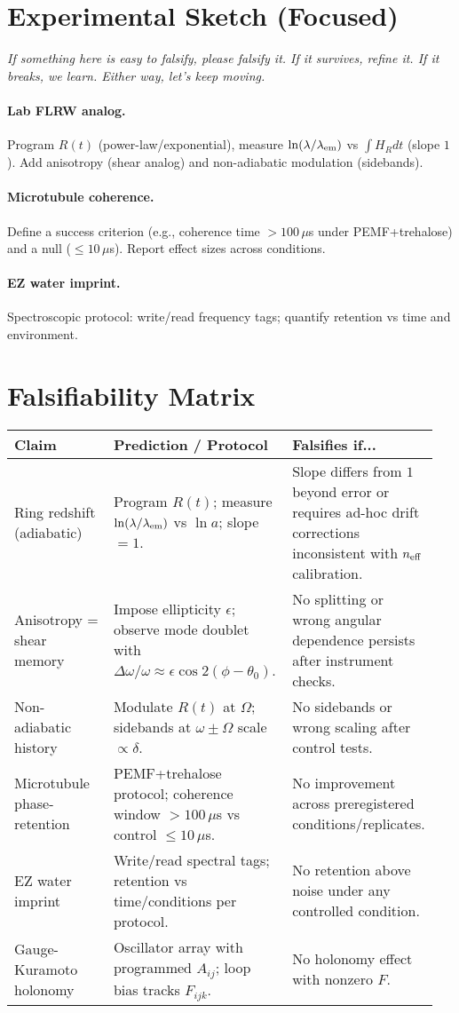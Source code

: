 \documentclass[11pt]{article}
\begin{document}
\section{Experimental Sketch (Focused)}
\noindent\textit{If something here is easy to falsify, please falsify it. If it survives, refine it. If it breaks, we learn. Either way, let's keep moving.}

\paragraph{Lab FLRW analog.} Program $R(t)$ (power-law/exponential), measure $\ln(\lambda/\lambda_{\rm em})$ vs $\int H_R dt$ (slope $1$). Add anisotropy (shear analog) and non-adiabatic modulation (sidebands).

\paragraph{Microtubule coherence.} Define a success criterion (e.g., coherence time $>100\,\mu$s under PEMF+trehalose) and a null ($\le 10\,\mu$s). Report effect sizes across conditions.

\paragraph{EZ water imprint.} Spectroscopic protocol: write/read frequency tags; quantify retention vs time and environment.

\section{Falsifiability Matrix}
\begin{tabular}{p{0.28\linewidth} p{0.45\linewidth} p{0.22\linewidth}}
\hline
\textbf{Claim} & \textbf{Prediction / Protocol} & \textbf{Falsifies if...} \\
\hline
Ring redshift (adiabatic) & Program $R(t)$; measure $\ln(\lambda/\lambda_{\rm em})$ vs $\ln a$; slope $=1$. & Slope differs from $1$ beyond error or requires ad-hoc drift corrections inconsistent with $n_{\rm eff}$ calibration. \\
Anisotropy = shear memory & Impose ellipticity $\epsilon$; observe mode doublet with $\Delta\omega/\omega\approx \epsilon\cos2(\phi-\theta_0)$. & No splitting or wrong angular dependence persists after instrument checks. \\
Non-adiabatic history & Modulate $R(t)$ at $\Omega$; sidebands at $\omega\pm\Omega$ scale $\propto \delta$. & No sidebands or wrong scaling after control tests. \\
Microtubule phase-retention & PEMF+trehalose protocol; coherence window $>100\,\mu$s vs control $\le 10\,\mu$s. & No improvement across preregistered conditions/replicates. \\
EZ water imprint & Write/read spectral tags; retention vs time/conditions per protocol. & No retention above noise under any controlled condition. \\
Gauge-Kuramoto holonomy & Oscillator array with programmed $A_{ij}$; loop bias tracks $F_{ijk}$. & No holonomy effect with nonzero $F$. \\
\hline
\end{tabular}
\end{document}
